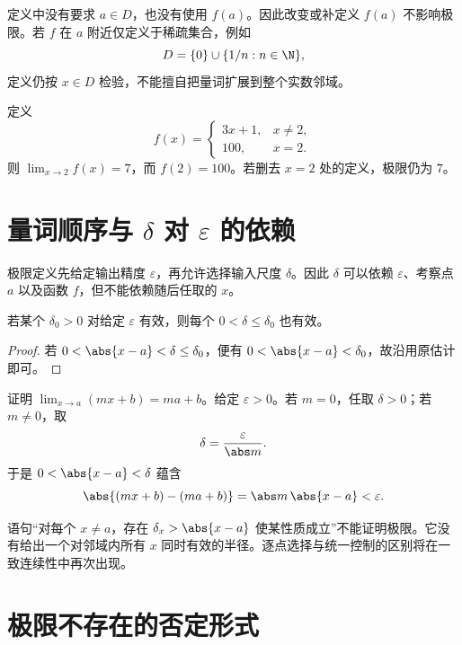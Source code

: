 定义中没有要求 \(a\in D\)，也没有使用 \(f(a)\)。因此改变或补定义 \(f(a)\) 不影响极限。若 \(f\) 在 \(a\) 附近仅定义于稀疏集合，例如
\[
 D=\{0\}\cup\{1/n:n\in\N\},
\]
定义仍按 \(x\in D\) 检验，不能擅自把量词扩展到整个实数邻域。

\begin{example}[点值与极限相互独立]
定义
\[
 f(x)=
 \begin{cases}
 3x+1,&x\ne2,\\
 100,&x=2.
 \end{cases}
\]
则 \(\lim_{x\to2}f(x)=7\)，而 \(f(2)=100\)。若删去 \(x=2\) 处的定义，极限仍为 \(7\)。
\end{example}

\section{量词顺序与 \texorpdfstring{\(\delta\)}{delta} 对 \texorpdfstring{\(\varepsilon\)}{epsilon} 的依赖}

极限定义先给定输出精度 \(\varepsilon\)，再允许选择输入尺度 \(\delta\)。因此 \(\delta\) 可以依赖 \(\varepsilon\)、考察点 \(a\) 以及函数 \(f\)，但不能依赖随后任取的 \(x\)。

\begin{proposition}[缩小半径]
若某个 \(\delta_0>0\) 对给定 \(\varepsilon\) 有效，则每个 \(0<\delta\le\delta_0\) 也有效。
\end{proposition}

\begin{proof}
若 \(0<\abs{x-a}<\delta\le\delta_0\)，便有 \(0<\abs{x-a}<\delta_0\)，故沿用原估计即可。
\end{proof}

\begin{example}[线性函数]
证明 \(\lim_{x\to a}(mx+b)=ma+b\)。给定 \(\varepsilon>0\)。若 \(m=0\)，任取 \(\delta>0\)；若 \(m\ne0\)，取
\[
 \delta=\frac{\varepsilon}{\abs m}.
\]
于是 \(0<\abs{x-a}<\delta\) 蕴含
\[
 \abs{(mx+b)-(ma+b)}=\abs m\,\abs{x-a}<\varepsilon.
\]
\end{example}

\begin{counterexample}[让半径依赖于 \(x\)]
语句“对每个 \(x\ne a\)，存在 \(\delta_x>\abs{x-a}\) 使某性质成立”不能证明极限。它没有给出一个对邻域内所有 \(x\) 同时有效的半径。逐点选择与统一控制的区别将在一致连续性中再次出现。
\end{counterexample}

\section{极限不存在的否定形式}


